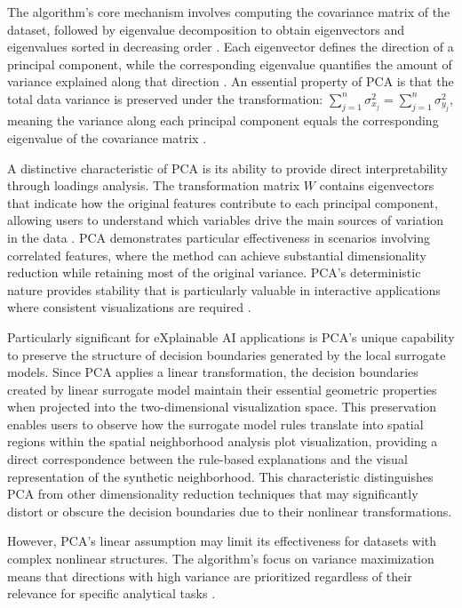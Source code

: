 The algorithm's core mechanism involves computing the covariance matrix of the dataset, followed by eigenvalue decomposition to obtain eigenvectors and eigenvalues sorted in decreasing order \cite{sewell2008pca}. Each eigenvector defines the direction of a principal component, while the corresponding eigenvalue quantifies the amount of variance explained along that direction \cite{gewers2021pca}. An essential property of PCA is that the total data variance is preserved under the transformation: $\sum_{j=1}^{n} \sigma^2_{x_j} = \sum_{j=1}^{n} \sigma^2_{y_j}$, meaning the variance along each principal component equals the corresponding eigenvalue of the covariance matrix \cite{gewers2021pca}.

A distinctive characteristic of PCA is its ability to provide direct interpretability through loadings analysis. The transformation matrix $W$ contains eigenvectors that indicate how the original features contribute to each principal component, allowing users to understand which variables drive the main sources of variation in the data \cite{gewers2021pca}. 
PCA demonstrates particular effectiveness in scenarios involving correlated features, where the method can achieve substantial dimensionality reduction while retaining most of the original variance.
PCA's deterministic nature 
provides stability that is particularly valuable in interactive applications where consistent visualizations are required \cite{gewers2021pca}.

Particularly significant for 
eXplainable AI
applications is PCA's unique capability to preserve the structure of decision boundaries generated by the local surrogate models. Since PCA applies a linear transformation, the decision boundaries created by
linear surrogate model maintain their essential geometric properties when projected into the two-dimensional visualization space. This preservation enables users to observe how the surrogate model rules translate into spatial regions within the spatial neighborhood analysis plot visualization, providing a direct correspondence between the rule-based explanations and the visual representation of the synthetic neighborhood. This characteristic distinguishes PCA from other dimensionality reduction techniques that may significantly distort or obscure the decision boundaries due to their nonlinear transformations.

However, PCA's linear assumption may limit its effectiveness for datasets with complex nonlinear structures. The algorithm's focus on variance maximization means that directions with high variance are prioritized regardless of their relevance for specific analytical tasks \cite{gewers2021pca}. 

